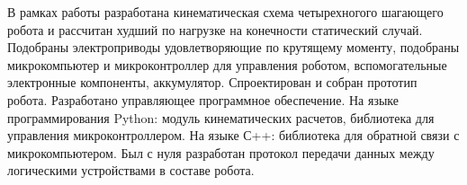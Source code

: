 
В рамках работы разработана кинематическая схема четырехногого шагающего робота и рассчитан худший по нагрузке на конечности статический случай. Подобраны электроприводы удовлетворяющие по крутящему моменту, подобраны микрокомпьютер и микроконтроллер для управления роботом, вспомогательные электронные компоненты, аккумулятор. Спроектирован и собран прототип робота. Разработано управляющее программное обеспечение. На языке программирования Python: модуль кинематических расчетов, библиотека для управления микроконтроллером. На языке С++: библиотека для обратной связи с микрокомпьютером. Был с нуля разработан протокол передачи данных между логическими устройствами в составе робота.